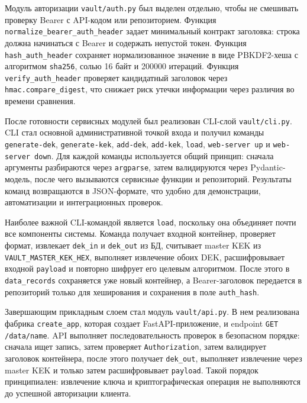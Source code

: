 \documentclass[14pt, a4paper]{extarticle}
\begin{document}
	Модуль авторизации \texttt{vault/auth.py} был выделен отдельно, чтобы не смешивать проверку Bearer с API-кодом или репозиторием. Функция \texttt{normalize\_bearer\_auth\_header} задает минимальный контракт заголовка: строка должна начинаться с Bearer и содержать непустой токен. Функция \texttt{hash\_auth\_header} сохраняет нормализованное значение в виде PBKDF2-хеша с алгоритмом \texttt{sha256}, солью 16 байт и 200000 итераций. Функция \texttt{verify\_auth\_header} проверяет кандидатный заголовок через \texttt{hmac.compare\_digest}, что снижает риск утечки информации через различия во времени сравнения.
	
	После готовности сервисных модулей был реализован CLI-слой \texttt{vault/cli.py}. CLI стал основной административной точкой входа и получил команды \texttt{generate-dek}, \texttt{generate-kek}, \texttt{add-dek}, \texttt{add-kek}, \texttt{load}, \texttt{web-server up} и \texttt{web-server down}. Для каждой команды используется общий принцип: сначала аргументы разбираются через \texttt{argparse}, затем валидируются через Pydantic-модель, после чего вызываются сервисные функции и репозиторий. Результаты команд возвращаются в JSON-формате, что удобно для демонстрации, автоматизации и интеграционных проверок.
	
	Наиболее важной CLI-командой является \texttt{load}, поскольку она объединяет почти все компоненты системы. Команда получает входной контейнер, проверяет формат, извлекает \texttt{dek\_in} и \texttt{dek\_out} из БД, считывает master KEK из \texttt{VAULT\_MASTER\_KEK\_HEX}, выполняет извлечение обоих DEK, расшифровывает входной \texttt{payload} и повторно шифрует его целевым алгоритмом. После этого в \texttt{data\_records} сохраняется уже новый контейнер, а Bearer-заголовок передается в репозиторий только для хеширования и сохранения в поле \texttt{auth\_hash}.
	
	Завершающим прикладным слоем стал модуль \texttt{vault/api.py}. В нем реализована фабрика \texttt{create\_app}, которая создает FastAPI-приложение, и endpoint \texttt{GET /data/{name}}. API выполняет последовательность проверок в безопасном порядке: сначала ищет запись, затем проверяет \texttt{Authorization}, затем валидирует заголовок контейнера, после этого получает \texttt{dek\_out}, выполняет извлечение через master KEK и только затем расшифровывает \texttt{payload}. Такой порядок принципиален: извлечение ключа и криптографическая операция не выполняются до успешной авторизации клиента.
	
\end{document}
